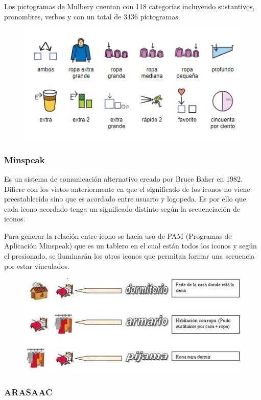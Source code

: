 Los pictogramas de Mulbery cuentan con 118 categorías incluyendo sustantivos, pronombres, verbos y con un total de 3436 pictogramas.

\begin{figure}[h!]
	\centering
	\includegraphics[width=0.7\linewidth]{Imagenes/Bitmap/Mulberry}
	\caption{}
	\label{fig:mulberry}
\end{figure}

\subsubsection{Minspeak}
Es un sistema de comunicación alternativo creado por Bruce Baker en 1982. Difiere con los vistos anteriormente en que el significado de los iconos no viene preestablecido sino que es acordado entre usuario y logopeda. Es por ello que cada icono acordado tenga un significado distinto según la secuenciación de iconos.

Para generar la relación entre icono se hacía uso de PAM (Programas de Aplicación Minspeak) que es un tablero en el cual están todos los iconos y según el presionado, se iluminarán los otros iconos que permitan formar una secuencia por estar vinculados.

\begin{figure}[h!]
	\centering
	\includegraphics[width=0.7\linewidth]{Imagenes/Bitmap/Minspeak}
	\caption{}
	\label{fig:minspeak}
\end{figure}


\subsubsection{ARASAAC}

